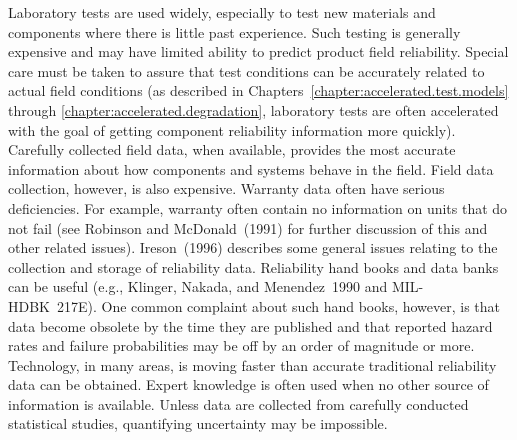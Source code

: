 Laboratory tests are used widely, especially to test new materials and
components where there is little past experience.  Such testing is
generally expensive and may have limited ability to predict product
field reliability. Special care must be taken to assure that test
conditions can be accurately related to actual field conditions (as
described in Chapters~\ref{chapter:accelerated.test.models} through
\ref{chapter:accelerated.degradation}, laboratory tests are often
accelerated with the goal of getting component reliability
information more quickly).  Carefully collected field data, when
available, provides the most accurate information about how
components and systems behave in the field.  Field data collection,
however, is also expensive.  Warranty data often have serious
deficiencies. For example, warranty often contain no information on
units that do not fail (see Robinson and McDonald~(1991) for further
discussion of this and other related issues). Ireson~(1996) 
describes some general issues relating to the collection
and storage of reliability data. Reliability hand
books and data banks can be useful (e.g., Klinger, Nakada, and
Menendez~1990 and MIL-HDBK~217E).  One common complaint about such
hand books, however, is that data become obsolete by the time they
are published and that reported hazard rates and failure
probabilities may be off by an order of magnitude or more.
Technology, in many areas, is moving faster than accurate
traditional reliability data can be obtained. Expert knowledge is
often used when no other source of information is available. Unless
data are collected from carefully conducted statistical studies,
quantifying uncertainty may be impossible.

